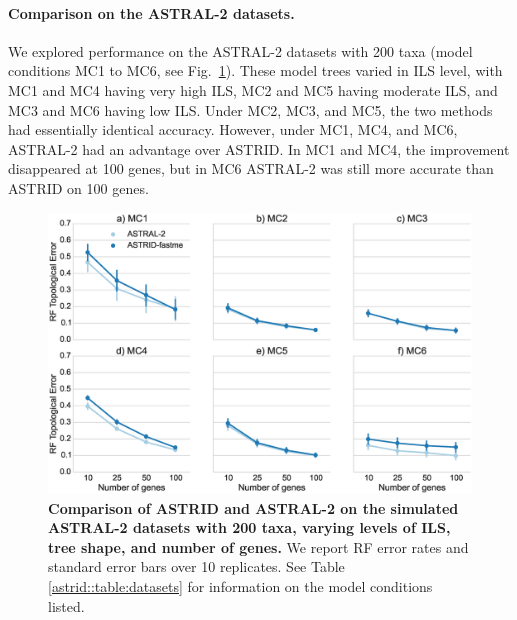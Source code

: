 \paragraph{Comparison on the ASTRAL-2 datasets. }
We explored performance on the ASTRAL-2 datasets
with 200 taxa (model conditions MC1 to MC6, see
Fig.~\ref{astrid::fig:astral2-ils}). %
These model trees varied in ILS level, with MC1 and MC4 having 
very high ILS, MC2 and MC5 having moderate ILS, and
MC3 and MC6 having low ILS. 
Under MC2, MC3, and MC5, the two methods had 
essentially identical accuracy. However, under MC1, MC4, and MC6, 
ASTRAL-2 had an advantage over ASTRID.
In MC1 and MC4, the improvement disappeared at 100 genes,
but in MC6 ASTRAL-2 was still more accurate than ASTRID on 100 genes.


\begin{figure}
  \centering
  \includegraphics[width=12cm]{astrid-figs/astral2-ils.eps}
  \caption[Comparison of ASTRID and ASTRAL-2
 on the simulated ASTRAL-2 datasets]{\textbf{Comparison of ASTRID and ASTRAL-2
 on the simulated ASTRAL-2 datasets
      with 200 taxa, varying levels of ILS, tree shape, and number of genes.}
     We report RF error
    rates and standard error 
bars over 10 replicates. See Table \ref{astrid::table:datasets} for
information on the model conditions listed. }
  \label{astrid::fig:astral2-ils}
\end{figure}

